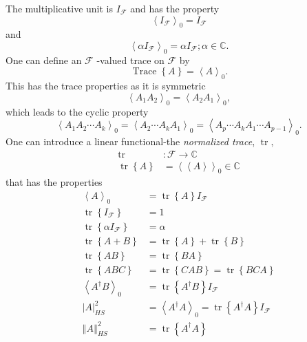 \documentclass[aps,preprint]{revtex4}%
\begin{document}
The multiplicative unit is $I_{\mathcal{F}}$ and has the property
\begin{equation}
\left\langle I_{\mathcal{F}}\right\rangle _{0}=I_{\mathcal{F}}%
\end{equation}
and
\begin{equation}
\left\langle \alpha I_{\mathcal{F}}\right\rangle _{0}=\alpha I_{\mathcal{F}%
};\alpha\in\mathbb{C}.
\end{equation}
One can define an $\mathcal{F}$ -valued trace on $\mathcal{F}$ by
\begin{equation}
\operatorname*{Trace}\left\{  A\right\}  =\left\langle A\right\rangle _{0}.
\end{equation}
This has the trace properties as it is symmetric
\begin{equation}
\left\langle A_{1}A_{2}\right\rangle _{0}=\left\langle A_{2}A_{1}\right\rangle
_{0},
\end{equation}
which leads to the cyclic property
\begin{equation}
\left\langle A_{1}A_{2}\cdots A_{k}\right\rangle _{0}=\left\langle A_{2}\cdots
A_{k}A_{1}\right\rangle _{0}=\left\langle A_{p}\cdots A_{k}A_{1}\cdots
A_{p-1}\right\rangle _{0}.
\end{equation}
One can introduce a linear functional-the \emph{normalized trace},
$\operatorname*{tr},$%
\begin{align}
\operatorname*{tr} &  :\mathcal{F}\longrightarrow\mathbb{C}\\
\operatorname*{tr}\left\{  A\right\}   &  =\left\langle \left\langle
A\right\rangle \right\rangle _{0}\in\mathbb{C}%
\end{align}
that has the properties
\begin{align}
\left\langle A\right\rangle _{0} &  =\operatorname*{tr}\left\{  A\right\}
I_{\mathcal{F}}\\
\operatorname*{tr}\left\{  I_{\mathcal{F}}\right\}   &  =1\\
\operatorname*{tr}\left\{  \alpha I_{\mathcal{F}}\right\}   &  =\alpha\\
\operatorname*{tr}\left\{  A+B\right\}   &  =\operatorname*{tr}\left\{
A\right\}  +\operatorname*{tr}\left\{  B\right\}  \\
\operatorname*{tr}\left\{  AB\right\}   &  =\operatorname*{tr}\left\{
BA\right\}  \\
\operatorname*{tr}\left\{  ABC\right\}   &  =\operatorname*{tr}\left\{
CAB\right\}  =\operatorname*{tr}\left\{  BCA\right\}  \\
\left\langle A^{\dagger}B\right\rangle _{0} &  =\operatorname*{tr}\left\{
A^{\dagger}B\right\}  I_{\mathcal{F}}\\
\left\vert A\right\vert _{HS}^{2} &  =\left\langle A^{\dagger}A\right\rangle
_{0}=\operatorname*{tr}\left\{  A^{\dagger}A\right\}  I_{\mathcal{F}}\\
\left\Vert A\right\Vert _{HS}^{2} &  =\operatorname*{tr}\left\{  A^{\dagger
}A\right\}
\end{align}
\end{document}
